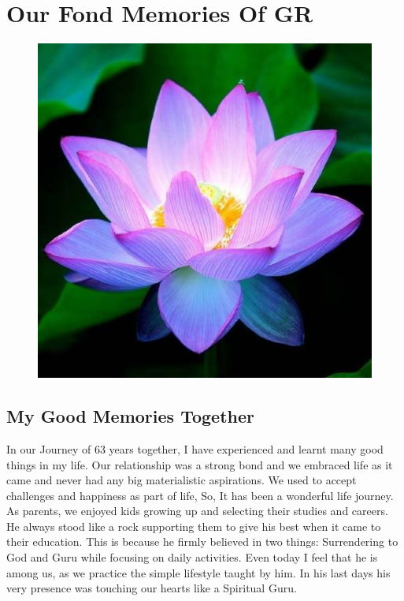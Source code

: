\chapter[Our Fond Memories Of GR]{Our Fond Memories Of GR}\label{chap36}

\lhead[\small\thepage]{\small\leftmark}


\begin{figure}[H]
\centering
\includegraphics[scale=.3]{figures/chap23-fig1.eps}
\end{figure}

\section*{My Good Memories Together}

In our Journey of 63 years together, I have experienced and learnt many good things in my life. Our relationship was a strong bond and we embraced life as it came and never had any big materialistic aspirations. We used to accept challenges and happiness as part of life, So, It has been a wonderful life journey. As parents, we enjoyed kids growing up and selecting their studies and careers. He always stood like a rock supporting them to give his best when it came to their education. This is because he firmly believed in two things: Surrendering to God and Guru while focusing on daily activities. Even today I feel that he is among us, as we practice the simple lifestyle taught by him. In his last days his very presence was touching our hearts like a Spiritual Guru. 

